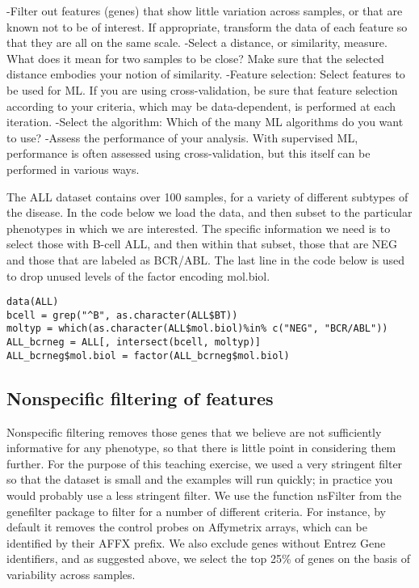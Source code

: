 -Filter out features (genes) that show little variation across samples,
or that are known not to be of interest. If appropriate, transform the
data of each feature so that they are all on the same scale. -Select a
distance, or similarity, measure. What does it mean for two samples to
be close? Make sure that the selected distance embodies your notion of
similarity. -Feature selection: Select features to be used for ML. If
you are using cross-validation, be sure that feature selection according
to your criteria, which may be data-dependent, is performed at each
iteration. -Select the algorithm: Which of the many ML algorithms do you
want to use? -Assess the performance of your analysis. With supervised
ML, performance is often assessed using cross-validation, but this
itself can be performed in various ways.

The ALL dataset contains over 100 samples, for a variety of different
subtypes of the disease. In the code below we load the data, and then
subset to the particular phenotypes in which we are interested. The
specific information we need is to select those with B-cell ALL, and
then within that subset, those that are NEG and those that are labeled
as BCR/ABL. The last line in the code below is used to drop unused
levels of the factor encoding mol.biol.

\begin{verbatim}
data(ALL)
bcell = grep("^B", as.character(ALL$BT))
moltyp = which(as.character(ALL$mol.biol)%in% c("NEG", "BCR/ABL"))
ALL_bcrneg = ALL[, intersect(bcell, moltyp)]
ALL_bcrneg$mol.biol = factor(ALL_bcrneg$mol.biol)
\end{verbatim}

\hypertarget{nonspecific-filtering-of-features}{%
\subsection{Nonspecific filtering of
features}\label{nonspecific-filtering-of-features}}

Nonspecific filtering removes those genes that we believe are not
sufficiently informative for any phenotype, so that there is little
point in considering them further. For the purpose of this teaching
exercise, we used a very stringent filter so that the dataset is small
and the examples will run quickly; in practice you would probably use a
less stringent filter. We use the function nsFilter from the genefilter
package to filter for a number of different criteria. For instance, by
default it removes the control probes on Affymetrix arrays, which can be
identified by their AFFX prefix. We also exclude genes without Entrez
Gene identifiers, and as suggested above, we select the top 25\% of
genes on the basis of variability across samples.

